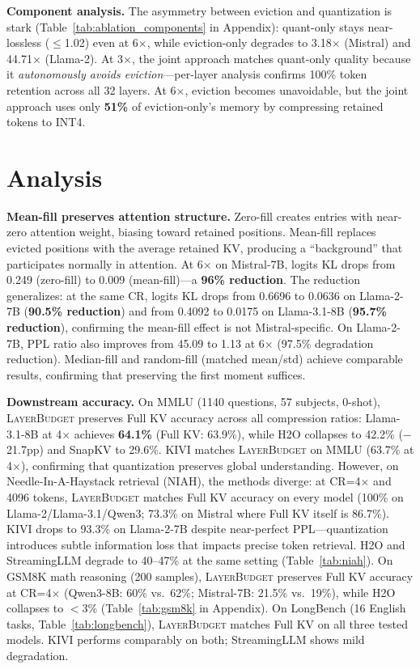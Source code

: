 \documentclass{article}
\newcommand{\layerbudget}{\textsc{LayerBudget}\xspace}
\begin{document}
\textbf{Component analysis.}
The asymmetry between eviction and quantization is stark (Table~\ref{tab:ablation_components} in Appendix): quant-only stays near-lossless ($\leq$1.02) even at 6$\times$, while eviction-only degrades to 3.18$\times$ (Mistral) and 44.71$\times$ (Llama-2).
At 3$\times$, the joint approach matches quant-only quality because it \emph{autonomously avoids eviction}---per-layer analysis confirms 100\% token retention across all 32 layers.
At 6$\times$, eviction becomes unavoidable, but the joint approach uses only \textbf{51\%} of eviction-only's memory by compressing retained tokens to INT4.

\section{Analysis}
\label{sec:analysis}

\textbf{Mean-fill preserves attention structure.}
Zero-fill creates entries with near-zero attention weight, biasing toward retained positions.
Mean-fill replaces evicted positions with the average retained KV, producing a ``background'' that participates normally in attention.
At 6$\times$ on Mistral-7B, logits KL drops from 0.249 (zero-fill) to 0.009 (mean-fill)---a \textbf{96\% reduction}.
The reduction generalizes: at the same CR, logits KL drops from 0.6696 to 0.0636 on Llama-2-7B (\textbf{90.5\% reduction}) and from 0.4092 to 0.0175 on Llama-3.1-8B (\textbf{95.7\% reduction}), confirming the mean-fill effect is not Mistral-specific.
On Llama-2-7B, PPL ratio also improves from 45.09 to 1.13 at 6$\times$ (97.5\% degradation reduction).
Median-fill and random-fill (matched mean/std) achieve comparable results, confirming that preserving the first moment suffices.

\textbf{Downstream accuracy.}
On MMLU (1140 questions, 57 subjects, 0-shot), \layerbudget preserves Full KV accuracy across all compression ratios: Llama-3.1-8B at 4$\times$ achieves \textbf{64.1\%} (Full KV: 63.9\%), while H2O collapses to 42.2\% ($-$21.7pp) and SnapKV to 29.6\%.
KIVI matches \layerbudget on MMLU (63.7\% at 4$\times$), confirming that quantization preserves global understanding.
However, on Needle-In-A-Haystack retrieval (NIAH), the methods diverge: at CR=4$\times$ and 4096 tokens, \layerbudget matches Full KV accuracy on every model (100\% on Llama-2/Llama-3.1/Qwen3; 73.3\% on Mistral where Full KV itself is 86.7\%).
KIVI drops to 93.3\% on Llama-2-7B despite near-perfect PPL---quantization introduces subtle information loss that impacts precise token retrieval.
H2O and StreamingLLM degrade to 40--47\% at the same setting (Table~\ref{tab:niah}).
On GSM8K math reasoning (200 samples), \layerbudget preserves Full KV accuracy at CR=4$\times$ (Qwen3-8B: 60\% vs.\ 62\%; Mistral-7B: 21.5\% vs.\ 19\%), while H2O collapses to $<$3\% (Table~\ref{tab:gsm8k} in Appendix).
On LongBench (16 English tasks, Table~\ref{tab:longbench}), \layerbudget matches Full KV on all three tested models.
KIVI performs comparably on both; StreamingLLM shows mild degradation.
\end{document}
